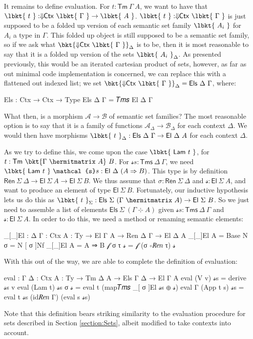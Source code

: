 It remains to define evaluation. For $t : \mathsf{Tm}~\Gamma~A$, we want to
have that $\lbkt{~t~} : \Downarrow\!\!\mathsf{Ctx}~\lbkt{~\Gamma~} \to
\lbkt{~A~}$. $\lbkt{~t~} : \Downarrow\!\!\mathsf{Ctx}~\lbkt{~\Gamma~}$ is just
supposed to be a folded up version of each semantic set family $\lbkt{~A_i~}$
for $A_i$ a type in $\Gamma$. This folded up object is still supposed to
be a semantic set family, so if we ask what $\bkt{\Downarrow\!\!\mathsf{Ctx}
~\lbkt{~\Gamma~}}_\Delta$ is to be, then it is most reasonable to say that
it is a folded up version of the sets $\lbkt{~A_i~}_\Delta$. As presented
previously, this would be an iterated cartesian product of sets, however, as
far as out minimal code implementation is concerned, we can replace this
with a flattened out indexed list; we set $\bkt{\Downarrow\!\!\mathsf{Ctx}
~\lbkt{~\Gamma~}}_\Delta = \mathsf{Els}~\Delta~\Gamma$, where:
\begin{code}
Els : Ctx → Ctx → Type
Els Δ Γ = 𝑇𝑚𝑠 El Δ Γ
\end{code}

What then, is a morphism $\mathcal{A} \to \mathcal{B}$ of semantic set families?
The most reasonable option is to say that it is a family of functions
$\mathcal{A}_\Delta \to \mathcal{B}_\Delta$ for each context $\Delta$. We
would then have morphisms $\lbkt{~t~}_\Delta : \mathsf{Els}~\Delta~\Gamma \to
\mathsf{El}~\Delta~A$ for each context $\Delta$.

As we try to define this, we come upon the case $\lbkt{~\mathsf{Lam}~t~}$, for
$t : \mathsf{Tm}~\bkt{\Gamma ~\hermitmatrix~A}~B$. For $\mathcal{s}s :
\mathsf{Tms}~\Delta~\Gamma$, we need $\lbkt{~\mathsf{Lam}~t~}~\mathcal{s}s :
\mathsf{El}~\Delta~(A \Rightarrow B)$. This type is by definition $\mathsf{Ren}
~\Sigma~\Delta \to \mathsf{El}~\Sigma~A \to \mathsf{El}~\Sigma~B$. We thus
assume that $\sigma : \mathsf{Ren}~\Sigma~\Delta$ and $\mathcal{s} : \mathsf{El}
~\Sigma~A$, and want to produce an element of type $\mathsf{El}~\Sigma~B$.
Fortunately, our inductive hypothesis lets us do this as $\lbkt{~t~}_\Sigma :
\mathsf{Els}~\Sigma ~(\Gamma~\hermitmatrix~A) \to \mathsf{El}~\Sigma~B$. So we
just need to assemble a list of elements $\mathsf{Els}~\Sigma~(\Gamma~
\hermitmatrix~A)$ given $\mathcal{s}s : \mathsf{Tms}~\Delta~\Gamma$ and
$\mathcal{s} : \mathsf{El} ~\Sigma~A$. In order to do this, we need a method or
renaming semantic elements:
\begin{code}
_[_]El : {Δ Γ : Ctx} {A : Ty} → El Γ A → Ren Δ Γ → El Δ A
_[_]El {A = Base} N σ = N [ σ ]Nf
_[_]El {A = A ⇒ B} 𝒻 σ τ 𝓈 = 𝒻 (σ ∘𝑅𝑒𝑛 τ) 𝓈
\end{code}
With this out of the way, we are able to complete the definition of evaluation:
\begin{code}
eval : {Γ Δ : Ctx} {A : Ty} → Tm Δ A → Els Γ Δ → El Γ A
eval (V v) 𝓈s = derive 𝓈s v
eval (Lam t) 𝓈s σ 𝓈 = eval t (map𝑇𝑚𝑠 _[ σ ]El 𝓈s ⊕ 𝓈)
eval {Γ} (App t s) 𝓈s = eval t 𝓈s (id𝑅𝑒𝑛 Γ) (eval s 𝓈s)
\end{code}
Note that this definition bears striking similarity to the evaluation procedure
for sets described in Section \ref{section:Sets}, albeit modified to take
contexts into account.


